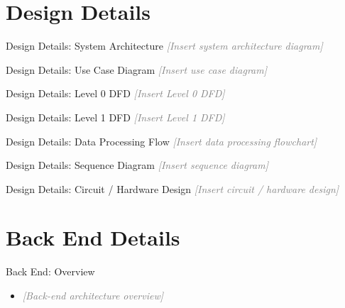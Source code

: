 \documentclass[aspectratio=169,11pt]{beamer}
\newcommand{\placeholder}[1]{\textcolor{gray}{\textit{[#1]}}}
\begin{document}
\section{Design Details}

\begin{frame}{Design Details: System Architecture}
  \centering
  \placeholder{Insert system architecture diagram}
\end{frame}

\begin{frame}{Design Details: Use Case Diagram}
  \centering
  \placeholder{Insert use case diagram}
\end{frame}

\begin{frame}{Design Details: Level 0 DFD}
  \centering
  \placeholder{Insert Level 0 DFD}
\end{frame}

\begin{frame}{Design Details: Level 1 DFD}
  \centering
  \placeholder{Insert Level 1 DFD}
\end{frame}

\begin{frame}{Design Details: Data Processing Flow}
  \centering
  \placeholder{Insert data processing flowchart}
\end{frame}

\begin{frame}{Design Details: Sequence Diagram}
  \centering
  \placeholder{Insert sequence diagram}
\end{frame}

\begin{frame}{Design Details: Circuit / Hardware Design}
  \centering
  \placeholder{Insert circuit / hardware design}
\end{frame}

\section{Back End Details}

\begin{frame}{Back End: Overview}
  \begin{itemize}
    \item \placeholder{Back-end architecture overview}
  \end{itemize}
\end{frame}
\end{document}
